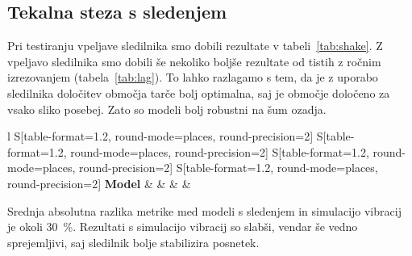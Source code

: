 \subsection{Tekalna steza s sledenjem}
Pri testiranju vpeljave sledilnika smo dobili rezultate v tabeli~\ref{tab:shake}. Z vpeljavo sledilnika smo dobili še nekoliko boljše rezultate od tistih z ročnim izrezovanjem (tabela~\ref{tab:lag}). To lahko razlagamo s tem, da je z uporabo sledilnika določitev območja tarče bolj optimalna, saj je območje določeno za vsako sliko posebej. Zato so modeli bolj robustni na šum ozadja.




\begin{table}[!htbp]
	\centering
	\begin{tabular}{l S[table-format=1.2, round-mode=places, round-precision=2] S[table-format=1.2, round-mode=places, round-precision=2] S[table-format=1.2, round-mode=places, round-precision=2] S[table-format=1.2, round-mode=places, round-precision=2]}
		\toprule
		\textbf{Model} & \thead{\corr} & \thead{\rae} & \thead{\rrse} & \theadm{\nsv}\\
		\midrule
		\bottomrule
	\end{tabular}
	\caption[Rezultati tekalne steze s sledenjem]{Rezultati tekalne steze s sledenjem. Pri modelih s \textit{sh} kratico smo uporabili simulacijo vibracij. Modeli \textit{tr} so brez vibracij.}
	\label{tab:shake}
\end{table}


Srednja absolutna razlika \rrse metrike med modeli s sledenjem in simulacijo vibracij je okoli \SI{30}{\%}. Rezultati s simulacijo vibracij so slabši, vendar še vedno sprejemljivi, saj sledilnik bolje stabilizira posnetek.












